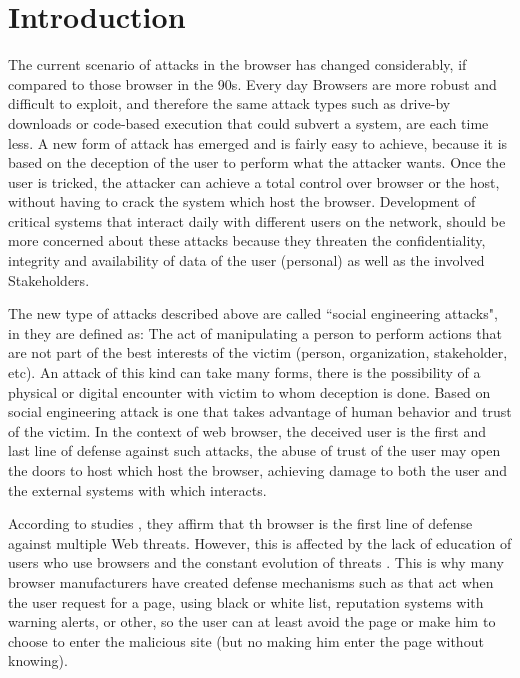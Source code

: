 \documentclass{sig-alternate-05-2015}
\begin{document}





\section*{Introduction}
The current scenario of attacks in the browser has changed considerably, if compared to those browser in the 90s. Every day Browsers are more robust and difficult to exploit, and therefore the same attack types such as drive-by downloads or code-based execution that could subvert a system, are each time less. A new form of attack has emerged and is fairly easy to achieve, because it is based on the deception of the user to perform what the attacker wants. Once the user is tricked, the attacker can achieve a total control over browser or the host, without having to crack the system \cite{Rajab2013,Labs2013} which host the browser. Development of critical systems that interact daily with different users on the network, should be more concerned about these attacks because they threaten the confidentiality, integrity and availability of data of the user (personal) as well as the involved Stakeholders.

The new type of attacks described above are called ``social engineering attacks", in \cite{socEngineering} they are defined as: The act of manipulating a person to perform actions that are not part of the best interests of the victim (person, organization, stakeholder, etc). An attack of this kind can take many forms, there is the possibility of a physical or digital encounter with victim to whom deception is done. Based on social engineering attack is one that takes advantage of human behavior and trust of the victim. In the context of web browser, the deceived user is the first and last line of defense against such attacks, the abuse of trust of the user may open the doors to host which host the browser, achieving damage to both the user and the external systems with which interacts.

According to studies \cite{browSecPhish,Labs2013,rowSecSEMBlock}, they affirm that  th browser is the first line of defense against multiple Web threats. However, this is affected by the lack of education of users who use browsers and the constant evolution of threats \cite{browSecPhish}. This is why many browser manufacturers have created defense mechanisms such as \cite{Drake2011} that act when the user request for a page, using black or white list, reputation systems \cite{Rajab2013} with warning alerts, or other, so the user can at least avoid the page or make him to choose to enter the malicious site (but no making him enter the page without knowing).
\end{document}
